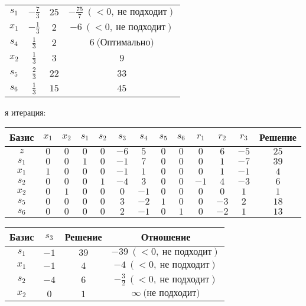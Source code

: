 \documentclass{article}%
\begin{document}
\begin{flushleft}
\begin{tabular}{|cccc|}
\hline%
$s_{1}$&$-\frac{7}{3}$&$25$&$-\frac{75}{7}\: (< 0, \: \text{не подходит})$\\%
$x_{1}$&$-\frac{1}{3}$&$2$&$-6\: (< 0, \: \text{не подходит})$\\%
$s_{4}$&$\frac{1}{3}$&$2$&$6\: \text{(Оптимально)}$\\%
$x_{2}$&$\frac{1}{3}$&$3$&$9$\\%
$s_{5}$&$\frac{2}{3}$&$22$&$33$\\%
$s_{6}$&$\frac{1}{3}$&$15$&$45$\\%
\hline%
\end{tabular}%
\newline%
\newline%
я итерация: %
\newline%
\newline%
\renewcommand{\arraystretch}{1.3}%
\begin{tabular}{|c|ccccccccccc|c|}%
\hline%
Базис&$x_{1}$&$x_{2}$&$s_{1}$&$s_{2}$&$s_{3}$&$s_{4}$&$s_{5}$&$s_{6}$&$r_{1}$&$r_{2}$&$r_{3}$&Решение\\%
\hline%
$z$&$0$&$0$&$0$&$0$&$-6$&$5$&$0$&$0$&$0$&$6$&$-5$&$25$\\%
\hline%
$s_{1}$&$0$&$0$&$1$&$0$&$-1$&$7$&$0$&$0$&$0$&$1$&$-7$&$39$\\%
$x_{1}$&$1$&$0$&$0$&$0$&$-1$&$1$&$0$&$0$&$0$&$1$&$-1$&$4$\\%
$s_{2}$&$0$&$0$&$0$&$1$&$-4$&$3$&$0$&$0$&$-1$&$4$&$-3$&$6$\\%
$x_{2}$&$0$&$1$&$0$&$0$&$0$&$-1$&$0$&$0$&$0$&$0$&$1$&$1$\\%
$s_{5}$&$0$&$0$&$0$&$0$&$3$&$-2$&$1$&$0$&$0$&$-3$&$2$&$18$\\%
$s_{6}$&$0$&$0$&$0$&$0$&$2$&$-1$&$0$&$1$&$0$&$-2$&$1$&$13$\\%
\hline%
\end{tabular}%
\newline%
\newline%
\newline%
\begin{tabular}{|cccc|}%
\hline%
Базис&$s_{3}$&Решение&Отношение\\%
\hline%
$s_{1}$&$-1$&$39$&$-39\: (< 0, \: \text{не подходит})$\\%
$x_{1}$&$-1$&$4$&$-4\: (< 0, \: \text{не подходит})$\\%
$s_{2}$&$-4$&$6$&$-\frac{3}{2}\: (< 0, \: \text{не подходит})$\\%
$x_{2}$&$0$&$1$&$\infty \: \text{(не подходит)}$\\%

\end{tabular}
\end{flushleft}
\end{document}
